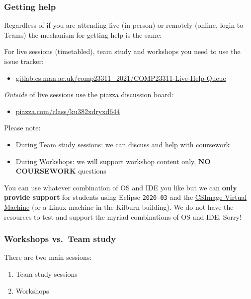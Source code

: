 \documentclass[
]{book}
\providecommand{\tightlist}{%
  \setlength{\itemsep}{0pt}\setlength{\parskip}{0pt}}
\begin{document}
\hypertarget{helpme}{%
\subsubsection{Getting help}\label{helpme}}

Regardless of if you are attending live (in person) or remotely (online, login to Teams) the mechanism for getting help is the same:

For live sessions (timetabled), team study and workshops you need to use the issue tracker:

\begin{itemize}
\tightlist
\item
  \href{https://gitlab.cs.man.ac.uk/comp23311_2021/COMP23311-Live-Help-Queue/}{gitlab.cs.man.ac.uk/comp23311\_2021/COMP23311-Live-Help-Queue}
\end{itemize}

\emph{Outside} of live sessions use the piazza discussion board:

\begin{itemize}
\tightlist
\item
  \href{https://piazza.com/class/ku382xdryxd644}{piazza.com/class/ku382xdryxd644}
\end{itemize}

Please note:

\begin{itemize}
\tightlist
\item
  During Team study sessions: we can discuss and help with coursework
\item
  During Workshops: we will support workshop content only, \textbf{NO COURSEWORK} questions
\end{itemize}

You can use whatever combination of OS and IDE you like but we can \textbf{only provide support} for students using Eclipse \texttt{2020-03} and the \href{https://wiki.cs.manchester.ac.uk/index.php/CSImage_VM}{CSImage Virtual Machine} (or a Linux machine in the Kilburn building). We do not have the resources to test and support the myriad combinations of OS and IDE. Sorry!

\hypertarget{workshops}{%
\subsubsection{Workshops vs.~Team study}\label{workshops}}

There are two main sessions:

\begin{enumerate}
\def\labelenumi{\arabic{enumi}.}
\tightlist
\item
  Team study sessions
\item
  Workshops
\end{enumerate}
\end{document}

